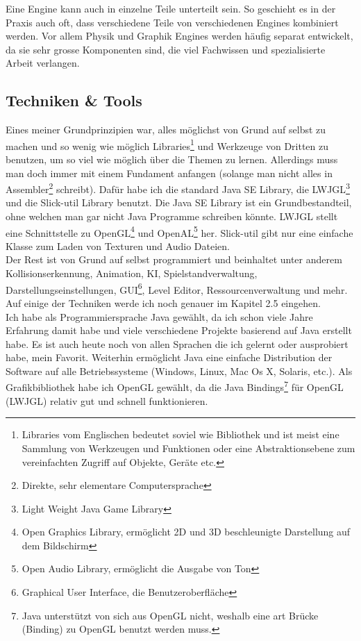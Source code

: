 \documentclass[12pt,a4paper,titlepage]{article}
\begin{document}
		Eine Engine kann auch in einzelne Teile unterteilt sein. So geschieht es in der Praxis auch oft, dass verschiedene Teile von verschiedenen Engines kombiniert werden. Vor allem Physik und Graphik Engines werden häufig separat entwickelt, da sie sehr grosse Komponenten sind, die viel Fachwissen und spezialisierte Arbeit verlangen.
		
	\subsection{Techniken \& Tools}
		Eines meiner Grundprinzipien war, alles möglichst von Grund auf selbst zu machen und so wenig wie möglich Libraries\footnote{Libraries vom Englischen bedeutet soviel wie Bibliothek und ist meist eine Sammlung von Werkzeugen und Funktionen oder eine Abstraktionsebene zum vereinfachten Zugriff auf Objekte, Geräte etc.} und Werkzeuge von Dritten zu benutzen, um so viel wie möglich über die Themen zu lernen. Allerdings muss man doch immer mit einem Fundament anfangen (solange man nicht alles in Assembler\footnote{Direkte, sehr elementare Computersprache} schreibt). 
		Dafür habe ich die standard Java SE Library, die LWJGL\footnote{Light Weight Java Game Library} und die Slick-util Library benutzt. Die Java SE Library ist ein Grundbestandteil, ohne welchen man gar nicht Java Programme schreiben könnte. LWJGL stellt eine Schnittstelle zu OpenGL\footnote{Open Graphics Library, ermöglicht 2D und 3D beschleunigte Darstellung auf dem Bildschirm} und OpenAL\footnote{Open Audio Library, ermöglicht die Ausgabe von Ton} her. Slick-util gibt nur eine einfache Klasse zum Laden von Texturen und Audio Dateien.\\
		
		Der Rest ist von Grund auf selbst programmiert und beinhaltet unter anderem Kollisionserkennung, Animation, KI, Spielstandverwaltung, Darstellungseinstellungen, GUI\footnote{Graphical User Interface, die Benutzeroberfläche}, Level Editor, Ressourcenverwaltung und mehr. Auf einige der Techniken werde ich noch genauer im Kapitel 2.5 eingehen.\\
		
		Ich habe als Programmiersprache Java gewählt, da ich schon viele Jahre Erfahrung damit habe und viele verschiedene Projekte basierend auf Java erstellt habe. Es ist auch heute noch von allen Sprachen die ich gelernt oder ausprobiert habe, mein Favorit. Weiterhin ermöglicht Java eine einfache Distribution der Software auf alle Betriebssysteme (Windows, Linux, Mac Os X, Solaris, etc.). Als Grafikbibliothek habe ich OpenGL gewählt, da die Java Bindings\footnote{Java unterstützt von sich aus OpenGL nicht, weshalb eine art Brücke (Binding) zu OpenGL benutzt werden muss.} für OpenGL (LWJGL) relativ gut und schnell funktionieren.
		
\end{document}
